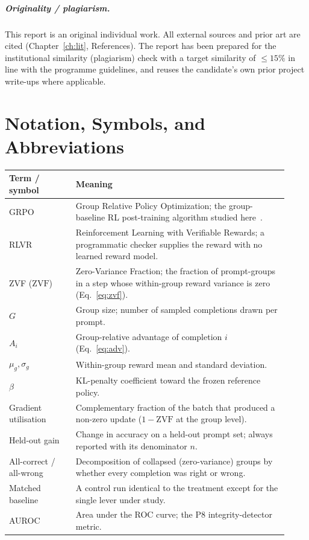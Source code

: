 \documentclass[12pt,a4paper]{report}
\newcommand{\zvf}{\mathrm{ZVF}}
\begin{document}
\paragraph{Originality / plagiarism.} This report is an original individual work. All
external sources and prior art are cited (Chapter~\ref{ch:lit}, References). The report
has been prepared for the institutional similarity (plagiarism) check with a target
similarity of $\le 15\%$ in line with the programme guidelines, and reuses the
candidate's own prior project write-ups where applicable.

\chapter{Notation, Symbols, and Abbreviations}
\label{app:glossary}
\begin{longtable}{@{}L{0.22\linewidth}L{0.70\linewidth}@{}}
\toprule
\textbf{Term / symbol} & \textbf{Meaning} \\
\midrule
\endhead
GRPO & Group Relative Policy Optimization; the group-baseline RL post-training
algorithm studied here~\cite{shao2024deepseekmath}. \\
RLVR & Reinforcement Learning with Verifiable Rewards; a programmatic checker
supplies the reward with no learned reward model. \\
ZVF ($\zvf$) & Zero-Variance Fraction; the fraction of prompt-groups in a step whose
within-group reward variance is zero (Eq.~\eqref{eq:zvf}). \\
$G$ & Group size; number of sampled completions drawn per prompt. \\
$A_i$ & Group-relative advantage of completion $i$ (Eq.~\eqref{eq:adv}). \\
$\mu_g,\sigma_g$ & Within-group reward mean and standard deviation. \\
$\beta$ & KL-penalty coefficient toward the frozen reference policy. \\
Gradient utilisation & Complementary fraction of the batch that produced a non-zero
update ($1-\zvf$ at the group level). \\
Held-out gain & Change in accuracy on a held-out prompt set; always reported with
its denominator $n$. \\
All-correct / all-wrong & Decomposition of collapsed (zero-variance) groups by
whether every completion was right or wrong. \\
Matched baseline & A control run identical to the treatment except for the single
lever under study. \\
AUROC & Area under the ROC curve; the P8 integrity-detector metric. \\
\bottomrule
\end{longtable}
\end{document}
